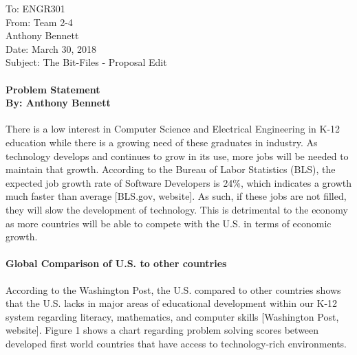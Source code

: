 \documentclass[12pt, letterpaper]{report}
\begin{document}
\thispagestyle{empty}

To: ENGR301\\
From: Team 2-4\\
\-\hspace{1.075cm} Anthony Bennett\\ 
Date: March 30, 2018\\
Subject: The Bit-Files - Proposal Edit

\paragraph*{\fontsize{14pt}{12pt}\selectfont Problem Statement \\  \fontsize{10pt}{12pt}\selectfont By: Anthony Bennett \\}
There is a low interest in Computer Science and Electrical Engineering in K-12 education while there is a growing need of these graduates in industry. As technology develops and continues to grow in its use, more jobs will be needed to maintain that growth. According to the Bureau of Labor Statistics (BLS), the expected job growth rate of Software Developers is 24\%, which indicates a growth much faster than average [BLS.gov, website]. As such, if these jobs are not filled, they will slow the development of technology. This is detrimental to the economy as more countries will be able to compete with the U.S. in terms of economic growth. 

\paragraph*{Global Comparison of U.S. to other countries \\ }
According to the Washington Post, the U.S. compared to other countries shows that the U.S. lacks in major areas of educational development within our K-12 system regarding literacy, mathematics, and computer skills [Washington Post, website]. Figure 1 shows a chart regarding problem solving scores between developed first world countries that have access to technology-rich environments. 
\end{document}
